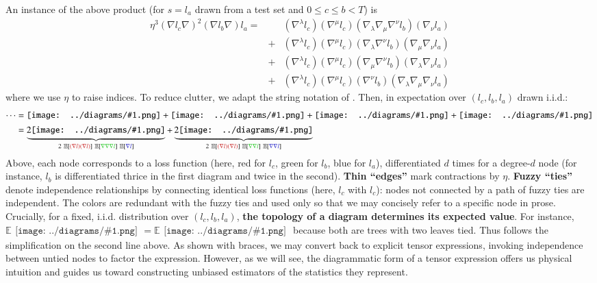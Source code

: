 \documentclass{article}
\newcommand{\expc}{\mathbb{E}}
\newcommand{\expct}[1]{\mathbb{E}\left[#1\right]}
\newcommand{\sdia}[1]{\begin{gathered}\texttt{[image: ../diagrams/\#1.png]}\end{gathered}}
\begin{document}
    An instance of the above product (for $s=l_a$ drawn from a test set and
    $0\leq c\leq b<T$) is \begin{align*}
        \eta^3 (\nabla l_c \nabla)^2 (\nabla l_b \nabla) l_a
        = & & (\nabla^\lambda l_c) (\nabla^\mu l_c) (\nabla_\lambda \nabla_\mu \nabla^\nu l_b) (\nabla_\nu l_a) \\
          &+& (\nabla^\lambda l_c) (\nabla^\mu l_c) (\nabla_\lambda \nabla^\nu l_b) (\nabla_\mu \nabla_\nu l_a) \\
          &+& (\nabla^\lambda l_c) (\nabla^\mu l_c) (\nabla_\mu \nabla^\nu l_b) (\nabla_\lambda \nabla_\nu l_a) \\
          &+& (\nabla^\lambda l_c) (\nabla^\mu l_c) (\nabla^\nu l_b) (\nabla_\lambda \nabla_\mu \nabla_\nu l_a)
    \end{align*}
    where we use $\eta$ to raise indices.  To reduce clutter, we adapt the
    string notation of \citet{pe71}.  Then, in expectation over $(l_c, l_b,
    l_a)$ drawn i.i.d.:
    \begin{align*}
        \cdots
        &= 
             \sdia{(01-2-3)(02-12-23)}
            +\sdia{(01-2-3)(02-13-23)}
            +\sdia{(01-2-3)(03-12-23)}
            +\sdia{(01-2-3)(03-13-23)} \\
        &=
            \underbrace{2\sdia{(01-2-3)(02-12-23)}}_{
                2~\expct{{\color{moor}(\nabla l)(\nabla l)}}~\expct{{\color{moog}\nabla\nabla\nabla l}}~\expct{{\color{moob} \nabla l}}
            }
            +
            \underbrace{2\sdia{(01-2-3)(02-13-23)}}_{
                2~\expct{{\color{moor}(\nabla l)(\nabla l)}}~\expct{{\color{moog}\nabla \nabla l}}~\expct{{\color{moob}\nabla \nabla l}}
            }
    \end{align*}
    Above, each node corresponds to a loss function (here, red for $l_c$, green
    for $l_b$, blue for $l_a$), differentiated $d$ times for a degree-$d$ node
    (for instance, $l_b$ is differentiated thrice in the first diagram and
    twice in the second).  {\bf Thin ``edges''} mark contractions by $\eta$.
    {\bf Fuzzy ``ties''} denote independence relationships by connecting
    identical loss functions (here, $l_c$ with $l_c$): nodes not connected by a
    path of fuzzy ties are independent.  The colors are redundant with the
    fuzzy ties and used only so that we may concisely refer to a specific node
    in prose.  Crucially, for a fixed, i.i.d. distribution over $(l_c, l_b,
    l_a)$, {\bf the topology of a diagram determines its expected value}.  For
    instance, $\expc \sdia{(01-2-3)(02-12-23)} = \expc
    \sdia{(01-2-3)(03-13-23)}$ because both are trees with two leaves tied.
    Thus follows the simplification on the second line above.  As shown with
    braces, we may convert back to explicit tensor expressions, invoking
    independence between untied nodes to factor the expression.  However, as we
    will see, the diagrammatic form of a tensor expression offers us physical
    intuition and guides us toward constructing unbiased estimators of the
    statistics they represent.  
    
\end{document}
